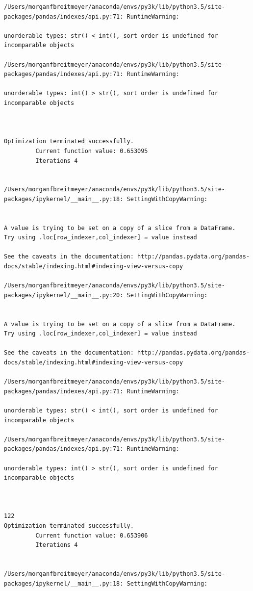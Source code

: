 \begin{lstlisting}
/Users/morganfbreitmeyer/anaconda/envs/py3k/lib/python3.5/site-packages/pandas/indexes/api.py:71: RuntimeWarning:

unorderable types: str() < int(), sort order is undefined for incomparable objects

/Users/morganfbreitmeyer/anaconda/envs/py3k/lib/python3.5/site-packages/pandas/indexes/api.py:71: RuntimeWarning:

unorderable types: int() > str(), sort order is undefined for incomparable objects



Optimization terminated successfully.
         Current function value: 0.653095
         Iterations 4


/Users/morganfbreitmeyer/anaconda/envs/py3k/lib/python3.5/site-packages/ipykernel/__main__.py:18: SettingWithCopyWarning:


A value is trying to be set on a copy of a slice from a DataFrame.
Try using .loc[row_indexer,col_indexer] = value instead

See the caveats in the documentation: http://pandas.pydata.org/pandas-docs/stable/indexing.html#indexing-view-versus-copy

/Users/morganfbreitmeyer/anaconda/envs/py3k/lib/python3.5/site-packages/ipykernel/__main__.py:20: SettingWithCopyWarning:


A value is trying to be set on a copy of a slice from a DataFrame.
Try using .loc[row_indexer,col_indexer] = value instead

See the caveats in the documentation: http://pandas.pydata.org/pandas-docs/stable/indexing.html#indexing-view-versus-copy

/Users/morganfbreitmeyer/anaconda/envs/py3k/lib/python3.5/site-packages/pandas/indexes/api.py:71: RuntimeWarning:

unorderable types: str() < int(), sort order is undefined for incomparable objects

/Users/morganfbreitmeyer/anaconda/envs/py3k/lib/python3.5/site-packages/pandas/indexes/api.py:71: RuntimeWarning:

unorderable types: int() > str(), sort order is undefined for incomparable objects



122
Optimization terminated successfully.
         Current function value: 0.653906
         Iterations 4


/Users/morganfbreitmeyer/anaconda/envs/py3k/lib/python3.5/site-packages/ipykernel/__main__.py:18: SettingWithCopyWarning:



\end{lstlisting}
